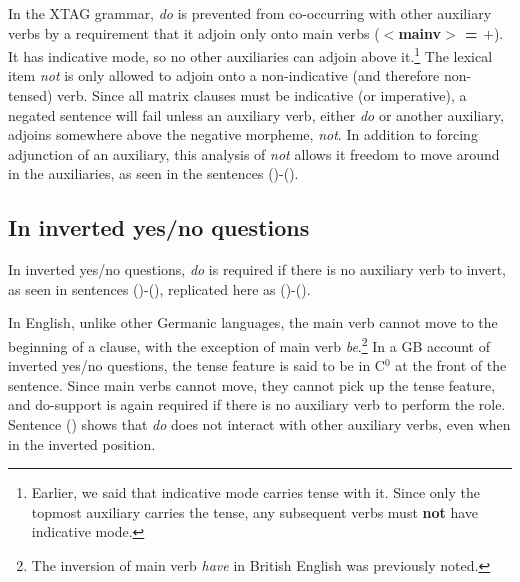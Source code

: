 
In the XTAG grammar, {\it do} is prevented from co-occurring with other
auxiliary verbs by a requirement that it adjoin only onto main verbs
({\bf $<$mainv$>$ = $+$}).  It has
indicative mode, so no other auxiliaries can adjoin above it.\footnote{Earlier,
we said that indicative mode carries tense with it.  Since only the topmost
auxiliary carries the tense, any subsequent verbs must {\bf not} have
indicative mode.}  The lexical item {\it not} is only allowed to adjoin onto a
non-indicative (and therefore non-tensed) verb.  Since all matrix clauses must
be indicative (or imperative), a negated sentence will fail unless an auxiliary
verb, either {\it do} or another auxiliary, adjoins somewhere above the
negative morpheme, {\it not}. In addition to forcing adjunction of an
auxiliary, this analysis of {\it not} allows it freedom to move around in the
auxiliaries, as seen in the sentences ()-().


\subsection{In inverted yes/no questions}

In inverted yes/no questions, {\it do} is required if there is no auxiliary
verb to invert, as seen in sentences ()-(), replicated here
as ()-().


In English, unlike other Germanic languages, the main verb cannot move to the
beginning of a clause, with the exception of main verb {\it be}.\footnote{The
inversion of main verb {\it have} in British English was previously noted.}  In
a GB account of inverted yes/no questions, the tense feature is said to be in
C$^{0}$ at the front of the sentence.  Since main verbs cannot move, they
cannot pick up the tense feature, and do-support is again required if there is
no auxiliary verb to perform the role.  Sentence () shows that {\it do}
does not interact with other auxiliary verbs, even when in the inverted
position.


